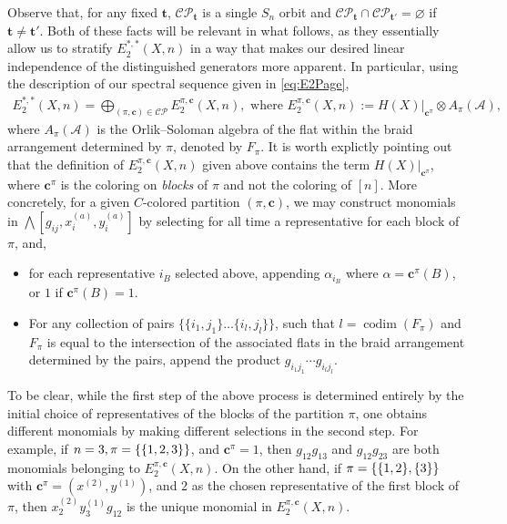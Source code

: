\documentclass[11pt,reqno]{amsproc}
\numberwithin{equation}{section}
\theoremstyle{definition}
\theoremstyle{remark}
\DeclareMathOperator{\codim}{codim}
\DeclarePairedDelimiter{\set}{\{}{\}}
\newcommand{\spp}[1]{^{(#1)}}
\begin{document}
Observe that, for any fixed $\mathbf{t}$, $\mathcal{CP}_\mathbf{t}$ is a single $S_n$ orbit and $\mathcal{CP}_\mathbf{t}\cap \mathcal{CP}_{\mathbf{t}'}=\varnothing$ if $\mathbf{t}\neq \mathbf{t}'$. Both of these facts will be relevant in what follows, as they essentially allow us to stratify $E_2^{*,*}(X,n)$ in a way that makes our desired linear independence of the distinguished generators more apparent. In particular, using the description of our spectral sequence given in \eqref{eq:E2Page},
\begin{align*}
   E_2^{*,*}(X,n)=\bigoplus_{( \pi,\mathbf{c})\in\mathcal{CP}} E_2^{\pi,\mathbf{c}}(X,n), \text{ where } E_2^{\pi,\mathbf{c}}(X,n):= H(X)|_{\mathbf{c}^\pi} \otimes A_\pi(\mathcal{A}),
\end{align*} 
where $A_\pi(\mathcal{A})$ is the Orlik--Soloman algebra of the flat within the braid arrangement determined by $\pi$, denoted by $F_\pi$. It is worth explictly pointing out that the definition of $E_2^{\pi,\mathbf{c}}(X,n)$ given above contains the term $H(X)|_{\mathbf{c}^\pi}$, where $\mathbf{c}^\pi$ is the coloring on \emph{blocks} of $\pi$ and not the coloring of $[n]$. More concretely, for a given $C$-colored partition $(\pi,\mathbf{c})$, we may construct monomials in $\bigwedge[g_{ij}, x\spp{a}_i, y\spp{a}_i]$ by selecting for all time a representative for each block of $\pi$, and,
\begin{itemize}
    \item for each representative $i_B$ selected above, appending $\alpha_{i_B}$ where $\alpha = \mathbf{c}^\pi(B)$, or $1$ if $\mathbf{c}^\pi(B) = 1$.
    \item For any collection of pairs $\{\{i_1,j_1\}\ldots \{i_l,j_l\}\}$, such that $l = \codim(F_\pi)$ and $F_\pi$ is equal to the intersection of the associated flats in the braid arrangement determined by the pairs, append the product $g_{i_1j_1}\cdots g_{i_lj_l}$.
\end{itemize}

To be clear, while the first step of the above process is determined entirely by the initial choice of representatives of the blocks of the partition $\pi$, one obtains different monomials by making different selections in the second step. For example, if $n=3, \pi=\set{\set{1,2,3}}$, and $\mathbf{c}^\pi=1$, then $g_{12}g_{13}$ and $g_{12}g_{23}$ are both monomials belonging to $E_2^{\pi,\mathbf{c}}(X,n)$. On the other hand, if $\pi = \set{\set{1,2},\set{3}}$ with $\mathbf{c}^\pi = (x\spp{2},y\spp{1})$, and $2$ as the chosen representative of the first block of $\pi$, then $x\spp{2}_2y\spp{1}_3g_{12}$ is the unique monomial in $E_2^{\pi,\mathbf{c}}(X,n)$.
\end{document}

